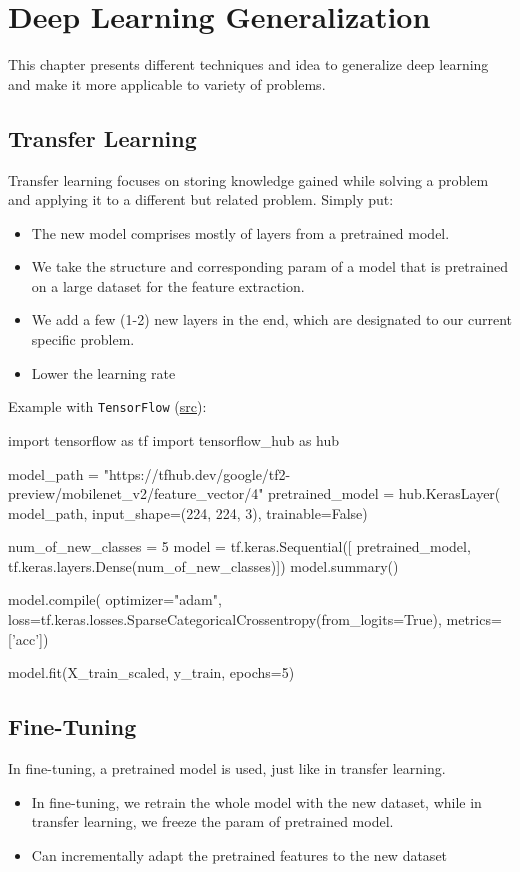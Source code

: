 \chapter{Deep Learning Generalization}
This chapter presents different techniques and idea to generalize deep learning and make it more applicable to variety of problems.

\section{Transfer Learning}
Transfer learning focuses on storing knowledge gained while solving a problem and applying it to a different but related problem. Simply put:
\begin{itemize}
	\item The new model comprises mostly of layers from a pretrained model.
	\item We take the structure and corresponding \ac{param} of a model that is pretrained on a large dataset for the feature extraction.
	\item We add a few (1-2) new layers in the end, which are designated to our current specific problem.
\end{itemize}


\note
\begin{itemize}
	\item Lower the learning rate
\end{itemize}

Example with \texttt{TensorFlow} (\href{https://github.com/codebasics/deep-learning-keras-tf-tutorial/tree/master/18_transfer_learning}{src}):
\begin{python}
import tensorflow as tf
import tensorflow_hub as hub

model_path = "https://tfhub.dev/google/tf2-preview/mobilenet_v2/feature_vector/4"
pretrained_model = hub.KerasLayer(
		model_path, input_shape=(224, 224, 3), trainable=False)

num_of_new_classes = 5
model = tf.keras.Sequential([
		pretrained_model,
		tf.keras.layers.Dense(num_of_new_classes)])
model.summary()

model.compile(
		optimizer="adam",
		loss=tf.keras.losses.SparseCategoricalCrossentropy(from_logits=True),
		metrics=['acc'])

model.fit(X_train_scaled, y_train, epochs=5)
\end{python}

\section{Fine-Tuning}
In fine-tuning, a pretrained model is used, just like in transfer learning.
\begin{itemize}
	\item In fine-tuning, we retrain the whole model with the new dataset, while in transfer learning, we freeze the \ac{param} of pretrained model.
	\item Can incrementally adapt the pretrained features to the new dataset
\end{itemize}

